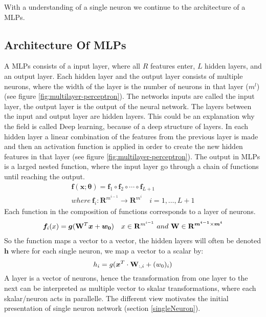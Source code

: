 With a understanding of a single neuron we continue to the architecture of a MLPs.


\subsection{Architecture Of MLPs}\label{architectureMLPs}
A MLPs consists of a input layer, where all $R$ features enter, $L$ hidden layers, and an output layer. Each hidden layer and the output layer consists of multiple neurons, where the width of the layer is the number of neurons in that layer ($m^l$) (see figure \ref{fig:multilayer-perceptron}). The networks inputs are called the input layer, the output layer is the output of the neural network. The layers between the input and output layer are hidden layers. This could be an explanation why the field is called Deep learning, because of a deep structure of layers. In each hidden layer a linear combination of the features from the previous layer is made and then an activation function is applied in order to create the new hidden features in that layer (see figure \ref{fig:multilayer-perceptron}). The output in MLPs is a larged nested function, where the input layer go through a chain of functions until reaching the output.
\begin{align}
\bm{f}(\bm{x};\bm{\theta})=\bm{f}_1 \circ \bm{f}_2 \circ \cdots \circ \bm{f}_{L+1}\\
where \ \bm{f}_i : \mathbf{R}^{m^{i-1}} \to \mathbf{R}^{m^{i}} \quad i=1,\ldots, L+1
\end{align}
Each function in the composition of functions corresponds to a layer of neurons.
\begin{align}
\bm{f}_i(x)=\bm{g}(\mathbf{W}^T \bm{x} + \bm{w_0}) \quad x\in \mathbf{R}^{m^{i-1}} \ and \ \mathbf{W} \in \mathbf{R}^{\bm{m^{i-1}} \times \bm{m^{i}} }
\end{align}
So the function maps a vector to a vector, the hidden layers will often be denoted $\bm{h}$ where for each single neuron, we map a vector to a scalar by:
$$h_i=g(\bm{x}^T \cdot \mathbf{W}_{:,i} + (w_0)_{i})$$
A layer is a vector of neurons, hence the transformation from one layer to the next can be interpreted as multiple vector to skalar transformations, where each skalar/neuron acts in parallelle. The different view motivates the initial presentation of single neuron network (section \ref{singleNeuron}).


